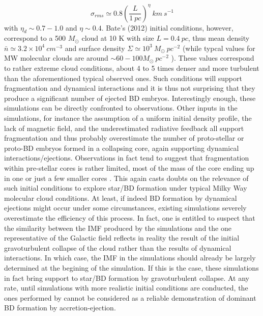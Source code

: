\begin{equation}
\sigma_{rms} \simeq 0.8 \left( \frac{L}{1~pc}\right)^{\eta} ~km~s^{-1}
\end{equation}
with $\eta_d \sim 0.7-1.0$ and $\eta \sim 0.4$.
Bate’s (2012) initial conditions, however, correspond to a 500 $M_{\odot}$ cloud at 10 K with size $L = 0.4~pc$, thus mean density 
$\bar{n} \simeq 3.2 \times 10^4 ~cm^{−3}$ and surface density $\Sigma \simeq 10^3 ~M_{\odot} ~pc^{−2}$ 
(while typcal values for MW molecular clouds are around $\sim 60-100 M_{\odot}~ pc^{−2}$ \citep{Heyer2009}). %
These values correspond to rather extreme cloud
conditions, about 4 to 5 times denser and more turbulent than the aforementioned typical observed ones. Such conditions 
will support fragmentation and dynamical interactions and it is thus not surprising that they produce a
significant number of ejected BD embryos. Interestingly enough, these simulations can be directly confronted to 
observations. 
Other inputs in the simulations, for instance the assumption of a uniform initial density profile, the lack of magnetic
field, and the underestimated radiative feedback all support fragmentation and thus probably overestimate the number
of proto-stellar or proto-BD embryos formed in a collapsing core, again supporting dynamical interactions/ejections. 
Observations in fact tend to suggest that fragmentation within pre-stellar cores is rather limited, most of the mass of the
core ending up in one or just a few smaller cores \citep{Bontemps2010, Tachihara2002}. This again
casts doubts on the relevance of such initial conditions to explore star/BD formation under typical Milky Way molecular 
cloud conditions. At least, if indeed BD formation by dynamical ejections might occur under some circumstances, 
existing simulations severely overestimate the efficiency of this process. In fact, one is entitled to suspect
that the similarity between the IMF produced by the simulations and the one representative of the Galactic field reflects
in reality the result of the initial gravoturbulent collapse of the cloud rather than the results of dynamical interactions.
In which case, the IMF in the simulations should already be largely determined at the begining of the simulation. If
this is the case, these simulations in fact bring support to star/BD formation by gravoturbulent collapse. At any rate,
until simulations with more realistic initial conditions are conducted, the ones performed by \cite{Bate2012} cannot be
considered as a reliable demonstration of dominant BD formation by accretion-ejection.

